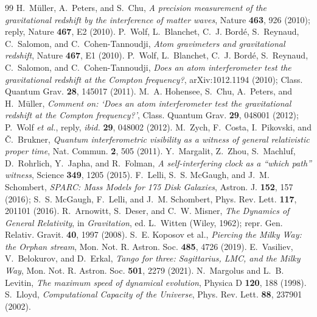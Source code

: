 \documentclass[11pt]{article}
\begin{document}
\begin{thebibliography}{99}
 H.~M\"uller, A.~Peters, and S.~Chu, \emph{A precision measurement of the gravitational redshift by the interference of matter waves}, Nature \textbf{463}, 926 (2010); reply, Nature \textbf{467}, E2 (2010).
 P.~Wolf, L.~Blanchet, C.~J. Bord\'e, S.~Reynaud, C.~Salomon, and C.~Cohen-Tannoudji, \emph{Atom gravimeters and gravitational redshift}, Nature \textbf{467}, E1 (2010).
 P.~Wolf, L.~Blanchet, C.~J. Bord\'e, S.~Reynaud, C.~Salomon, and C.~Cohen-Tannoudji, \emph{Does an atom interferometer test the gravitational redshift at the Compton frequency?}, arXiv:1012.1194 (2010); Class. Quantum Grav. \textbf{28}, 145017 (2011).
 M.~A. Hohensee, S.~Chu, A.~Peters, and H.~M\"uller, \emph{Comment on: `Does an atom interferometer test the gravitational redshift at the Compton frequency?'}, Class. Quantum Grav. \textbf{29}, 048001 (2012); P.~Wolf \emph{et al.}, reply, \emph{ibid.} \textbf{29}, 048002 (2012).
 M.~Zych, F.~Costa, I.~Pikovski, and \v{C}.~Brukner, \emph{Quantum interferometric visibility as a witness of general relativistic proper time}, Nat. Commun. \textbf{2}, 505 (2011).
 Y.~Margalit, Z.~Zhou, S.~Machluf, D.~Rohrlich, Y.~Japha, and R.~Folman, \emph{A self-interfering clock as a ``which path'' witness}, Science \textbf{349}, 1205 (2015).
 F.~Lelli, S.~S. McGaugh, and J.~M. Schombert, \emph{SPARC: Mass Models for 175 Disk Galaxies}, Astron. J. \textbf{152}, 157 (2016); S.~S. McGaugh, F.~Lelli, and J.~M. Schombert, Phys. Rev. Lett. \textbf{117}, 201101 (2016).
 R.~Arnowitt, S.~Deser, and C.~W. Misner, \emph{The Dynamics of General Relativity}, in \emph{Gravitation}, ed. L.~Witten (Wiley, 1962); repr. Gen. Relativ. Gravit. \textbf{40}, 1997 (2008).
 S.~E. Koposov et al., \emph{Piercing the Milky Way: the Orphan stream}, Mon. Not. R. Astron. Soc. \textbf{485}, 4726 (2019).
 E.~Vasiliev, V.~Belokurov, and D.~Erkal, \emph{Tango for three: Sagittarius, LMC, and the Milky Way}, Mon. Not. R. Astron. Soc. \textbf{501}, 2279 (2021).
 N.~Margolus and L.~B. Levitin, \emph{The maximum speed of dynamical evolution}, Physica D \textbf{120}, 188 (1998).
 S.~Lloyd, \emph{Computational Capacity of the Universe}, Phys. Rev. Lett. \textbf{88}, 237901 (2002).
\end{thebibliography}
\end{document}
